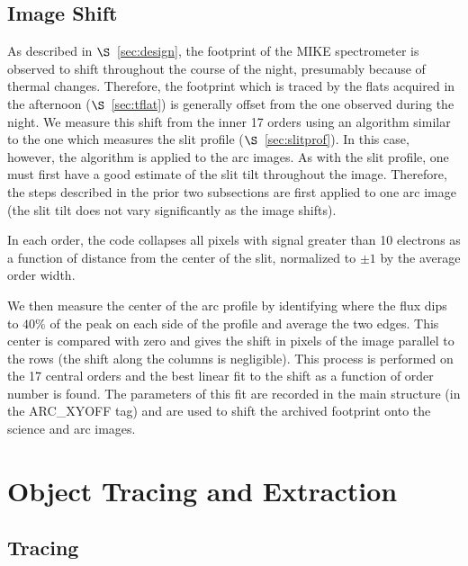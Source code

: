 \documentclass[]{emulateapj}
\begin{document}
\subsection{Image Shift}
\label{sec:shift}

As described in $\S$~\ref{sec:design}, the footprint of the
MIKE spectrometer is observed to shift throughout the course
of the night, presumably because of thermal changes. 
Therefore, the footprint which is traced by the
flats acquired in the afternoon ($\S$~\ref{sec:tflat})
is generally offset from the one observed during the night.
We measure this shift from the inner 17 orders using
an algorithm similar to the one which measures the slit
profile ($\S$~\ref{sec:slitprof}).  In this case, however,
the algorithm is applied to the arc images.  As with the slit
profile, one must first have a good estimate of the slit
tilt throughout the image.  Therefore, the steps described in
the prior two subsections are first applied to one arc image
(the slit tilt does not vary significantly as the image shifts).

In each order,  the code collapses all pixels
with signal greater than 10 electrons as a function of 
distance from the center of the slit, normalized to
$\pm 1$ by the average order width.  

We then measure the
center of the arc profile by identifying where the flux
dips to $40\%$ of the peak on each side of the profile
and average the two edges.  This center is compared with
zero and gives the shift in pixels of the image parallel
to the rows (the shift along the columns is negligible).
This process is performed on the 17 central orders and the best
linear fit to the shift as a function of order number is found.  
The parameters of this fit are recorded in the main structure 
(in the ARC\_XYOFF tag) and are
used to shift the archived footprint onto the science and
arc images.

%

 
\section{Object Tracing and Extraction}
\label{sec:object}

\subsection{Tracing}
\end{document}

